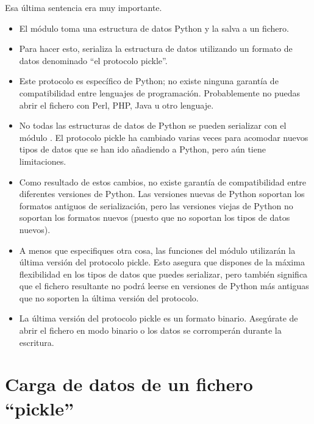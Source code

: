 Esa última sentencia era muy importante.

\begin{itemize}

\item El módulo  toma una estructura de datos Python y la salva a un fichero.

\item Para hacer esto, serializa la estructura de datos utilizando un formato de datos denominado ``el protocolo pickle''.

\item Este protocolo es específico de Python; no existe ninguna garantía de compatibilidad entre lenguajes de programación. Probablemente no puedas abrir el fichero  con Perl, PHP, Java u otro lenguaje.

\item No todas las estructuras de datos de Python se pueden serializar con el módulo . El protocolo pickle ha cambiado varias veces para acomodar nuevos tipos de datos que se han ido añadiendo a Python, pero aún tiene limitaciones.

\item Como resultado de estos cambios, no existe garantía de compatibilidad entre diferentes versiones de Python. Las versiones nuevas de Python soportan los formatos antiguos de serialización, pero las versiones viejas de Python no soportan los formatos nuevos (puesto que no soportan los tipos de datos nuevos).

\item A menos que especifiques otra cosa, las funciones del módulo  utilizarán la última versión del protocolo pickle. Esto asegura que dispones de la máxima flexibilidad en los tipos de datos que puedes serializar, pero también significa que el fichero resultante no podrá leerse en versiones de Python más antiguas que no soporten la última versión del protocolo.

\item La última versión del protocolo pickle es un formato binario. Asegúrate de abrir el fichero en modo binario o los datos se corromperán durante la escritura.

\end{itemize}

\section{Carga de datos de un fichero ``pickle''}

